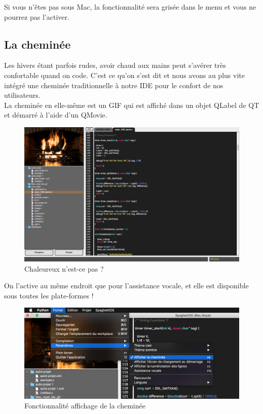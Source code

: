 \documentclass[a4paper,12pt]{article}
\begin{document}
	Si vous n'êtes pas sous Mac, la fonctionnalité sera grisée dans le menu et vous ne pourrez pas l'activer.
	
	\newpage
	
	\subsection{La cheminée}
	
		Les hivers étant parfois rudes, avoir chaud aux mains peut s'avérer très confortable quand on code. C'est ce qu'on s'est dit et nous avons au plus vite intégré une cheminée traditionnelle à notre IDE pour le confort de nos utilisateurs.\\
		
		La cheminée en elle-même est un GIF qui est affiché dans un objet QLabel de QT et démarré à l'aide d'un QMovie.\\
		
		\begin{figure}[h!]
			\begin{center}
					\includegraphics[scale=0.3]{images/cheminee}
					\caption{Chaleureux n'est-ce pas ?}
			\end{center}
	\end{figure}
	
	On l'active au même endroit que pour l'assistance vocale, et elle est disponible sous toutes les plate-formes !\\
	
	\begin{figure}[h!]
			\begin{center}
					\includegraphics[scale=0.2]{images/activ_cheminee}
					\caption{Fonctionnalité affichage de la cheminée}
			\end{center}
	\end{figure}
	
\end{document}
